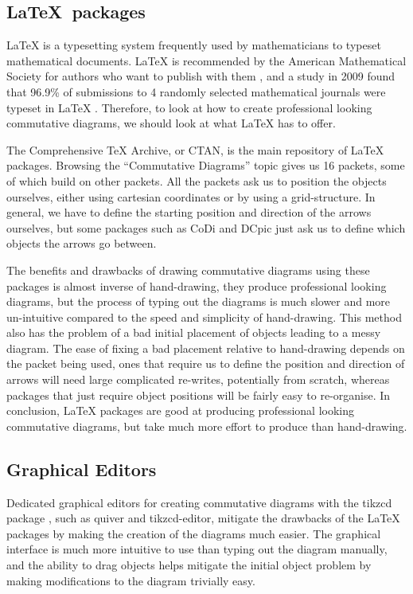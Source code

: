 \documentclass[logo,bsc,singlespacing,parskip]{infthesis}
\theoremstyle{definition}
\begin{document}
\subsection{\LaTeX\ packages}
\LaTeX{} is a typesetting system frequently used by mathematicians to typeset mathematical documents. \LaTeX{} is recommended by the American Mathematical Society for authors who want to publish with them \cite{AMSlatexrec}, and a study in 2009 found that 96.9\% of submissions to 4 randomly selected mathematical journals were typeset in \LaTeX{} \cite{brischoux2009don}. Therefore, to look at how to create professional looking commutative diagrams, we should look at what \LaTeX{} has to offer.

The Comprehensive \TeX{} Archive, or CTAN, is the main repository of \LaTeX{} packages. Browsing the ``Commutative Diagrams'' topic \cite{ctancommdiag} gives us 16 packets, some of which build on other packets. All the packets ask us to position the objects ourselves, either using cartesian coordinates or by using a grid-structure. %
In general, we have to define the starting position and direction of the arrows ourselves, but some packages such as CoDi \cite{Brasolin_2023} and DCpic \cite{Quaresma_2013} just ask us to define which objects the arrows go between.

The benefits and drawbacks of drawing commutative diagrams using these packages is almost inverse of hand-drawing, they produce professional looking diagrams, but the process of typing out the diagrams is much slower and more un-intuitive compared to the speed and simplicity of hand-drawing. This method also has the problem of a bad initial placement of objects leading to a messy diagram. The ease of fixing a bad placement relative to hand-drawing depends on the packet being used, ones that require us to define the position and direction of arrows will need large complicated re-writes, potentially from scratch, whereas packages that just require object positions will be fairly easy to re-organise. In conclusion, \LaTeX{} packages are good at producing professional looking commutative diagrams, but take much more effort to produce than hand-drawing.

\subsection{Graphical Editors}
Dedicated graphical editors for creating commutative diagrams with the tikzcd package \cite{Stoffel_2021}, such as quiver \cite{Arkor_quiver_2023} and tikzcd-editor, \cite{shen_tikzcd-editor_2023} mitigate the drawbacks of the \LaTeX{} packages by making the creation of the diagrams much easier. The graphical interface is much more intuitive to use than typing out the diagram manually, and the ability to drag objects helps mitigate the initial object problem by making modifications to the diagram trivially easy. 
\end{document}

